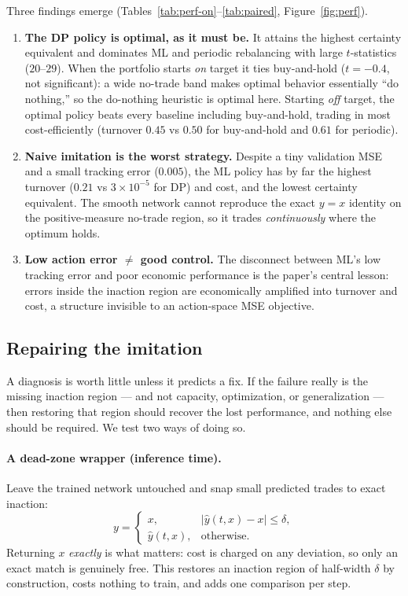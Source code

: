 \documentclass[11pt]{article}
\begin{document}
Three findings emerge (Tables~\ref{tab:perf-on}--\ref{tab:paired},
Figure~\ref{fig:perf}).
\begin{enumerate}
\item \textbf{The DP policy is optimal, as it must be.} It attains the highest
certainty equivalent and dominates ML and periodic rebalancing with large
$t$-statistics ($20$--$29$). When the portfolio starts \emph{on} target it ties
buy-and-hold ($t=-0.4$, not significant): a wide no-trade band makes optimal
behavior essentially ``do nothing,'' so the do-nothing heuristic is optimal
here. Starting \emph{off} target, the optimal policy beats every baseline
including buy-and-hold, trading in most cost-efficiently (turnover $0.45$ vs
$0.50$ for buy-and-hold and $0.61$ for periodic).
\item \textbf{Naive imitation is the worst strategy.} Despite a tiny validation
MSE and a small tracking error ($0.005$), the ML policy has by far the highest
turnover ($0.21$ vs $3\times10^{-5}$ for DP) and cost, and the lowest certainty
equivalent. The smooth network cannot reproduce the exact $y=x$ identity on the
positive-measure no-trade region, so it trades \emph{continuously} where the
optimum holds.
\item \textbf{Low action error $\ne$ good control.} The disconnect between ML's
low tracking error and poor economic performance is the paper's central lesson:
errors inside the inaction region are economically amplified into turnover and
cost, a structure invisible to an action-space MSE objective.
\end{enumerate}

\subsection{Repairing the imitation}
\label{sec:remedies}
A diagnosis is worth little unless it predicts a fix. If the failure really is
the missing inaction region --- and not capacity, optimization, or
generalization --- then restoring that region should recover the lost
performance, and nothing else should be required. We test two ways of doing so.

\paragraph{A dead-zone wrapper (inference time).}
Leave the trained network untouched and snap small predicted trades to exact
inaction:
\begin{equation}
y=\begin{cases}
x, & |\hat y(t,x)-x|\le\delta,\\[2pt]
\hat y(t,x), & \text{otherwise.}
\end{cases}
\label{eq:deadzone}
\end{equation}
Returning $x$ \emph{exactly} is what matters: cost is charged on any deviation,
so only an exact match is genuinely free. This restores an inaction region of
half-width $\delta$ by construction, costs nothing to train, and adds one
comparison per step.
\end{document}
